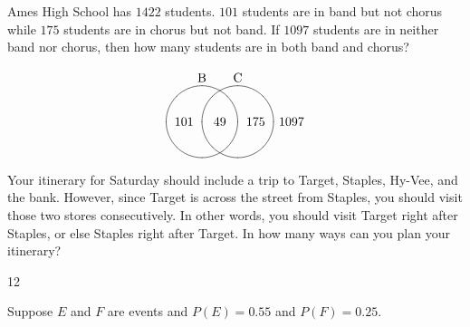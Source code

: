 \documentclass[addpoints,12pt]{exam}
\begin{document}
\begin{questions}

\question[12] Ames High School has $1422$ students.
$101$ students are in band but not chorus while
$175$ students are in chorus but not band.
If $1097$ students are in neither band nor chorus,
then how many students are in both band and chorus?
\begin{solution}
\[\begin{xy}<.5cm,0cm>:
(-1,2)*+!D{\text{B}};
(1,2)*+!D{\text{C}};
(-1,0)*\cir<1cm>{};
(1,0)*\cir<1cm>{};
(0,0)*{49};
(-2,0)*{101};
(2,0)*{175};
(4,0)*{1097};
\end{xy}\]
\end{solution}
\newpage

\question[15] Your itinerary for Saturday should
include a trip to Target, Staples, Hy-Vee, and the bank.
However, since Target is across the street from Staples,
you should visit those two stores consecutively. In other
words, you should visit Target right after Staples, or else
Staples right after Target. In how many ways
can you plan your itinerary?
\begin{solution}12\end{solution}
\vspace{5in}

\question[15] Suppose $E$ and $F$ are events
and $P\left(E\right)=0.55$ and $P\left(F\right)=0.25$.
\begin{solution}
\end{solution}
\end{questions}
\end{document}
